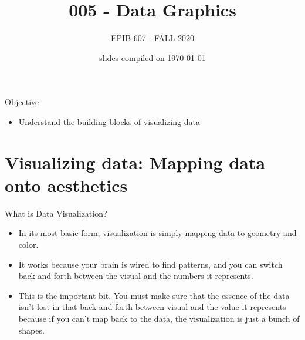 \documentclass[10pt,handout]{beamer}\usepackage[]{graphicx}\usepackage[]{color}
\begin{document}
	
	
	
	
	\title{005 - Data Graphics}
	\author{EPIB 607 - FALL 2020}
	
	\date{slides compiled on \today}
	
	\maketitle
	
	\begin{frame}{Objective}
	\begin{itemize}
		\item Understand the building blocks of visualizing data
	\end{itemize}
	\end{frame}
	
	\section{Visualizing data: Mapping data onto aesthetics}
	
		\begin{frame}{What is Data Visualization?}
		\begin{itemize}
			\item In its most basic form, visualization is simply mapping data to geometry and color. 
			\item It works because your brain is wired to find patterns, and you can switch back and forth between the visual and the numbers it represents. 
			\item This is the important bit. You must make sure that the essence of the data isn't lost in that back and forth between visual and the value it represents because if you can't map back to the data, the visualization is just a bunch of shapes.
		\end{itemize}
	\end{frame}
	
\end{document}
